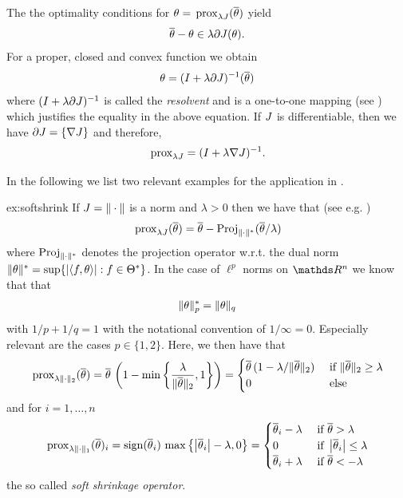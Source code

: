 %
\begin{remark}{}{}
The the optimality conditions for $\theta=\,\mathrm{prox}_{\lambda J}(\overline{\theta})$ yield 
%
\begin{align*}
\pparam - \param \in \lambda \partial \func(\param).%
\end{align*}
%
For a proper, closed and convex function we obtain
%
\begin{align*}
\theta = (I + \lambda\partial J)^{-1}(\overline\theta)
\end{align*}
%
where $(I + \lambda\partial J)^{-1}$ is called the \emph{resolvent} and is a one-to-one mapping (see \cite[Ch. 3.2]{parikh2014proximal})  which justifies the equality in the above equation. If $J$ is differentiable, then we have $\partial J = \{\nabla J\}$ and therefore,
%
\begin{align*}
\,\mathrm{prox}_{\lambda J} = (I + \lambda\nabla J)^{-1}.
\end{align*}
\end{remark}
%
%
\noindent%
In the following we list two relevant examples for the application in \cite{bungert2022bregman, bungert2021neural}.
%
\begin{example}{}{ex:softshrink}
If $J=\|\cdot\|$ is a norm and $\lambda>0$ then we have that (see e.g. \cite{parikh2014proximal})
%
\begin{align*}
\,\mathrm{prox}_{\lambda J}(\overline\theta) = 
\overline\theta - \operatorname{Proj}_{\|\cdot\|^\ast}(\overline\theta/\lambda)
\end{align*}
%
where $\operatorname{Proj}_{\|\cdot\|^\ast}$ denotes the projection operator w.r.t. the dual norm $\|\theta\|^\ast = \sup\{\left|\langle f , \theta\rangle\right|: f\in\Theta^\ast\}$. In the case of $\ell^p$ norms on $\R^n$ we know that that 
%
\begin{align*}
\|\theta\|_p^\ast = \|\theta\|_q
\end{align*}
%
with $1/p + 1/q = 1$ with the notational convention of $1/\infty=0$. Especially relevant are the cases $p\in\{1,2\}$. Here, we then have that
%
\begin{align*}
\prox{\lambda\norm{\cdot}_2}(\pparam) = 
%
\pparam\,\left(1 - \min\left\{\frac{\lambda}{\norm{\pparam}_2}, 1\right\}\right)=
%
\begin{cases}
\pparam\,(1 - \lambda/\norm{\pparam}_2) &\text{ if } \norm{\pparam}_2 \geq \lambda\\
0 &\text{ else}
\end{cases}
\end{align*}
%
and for $i=1,\ldots,n$
%
\begin{align*}
\prox{\lambda\norm{\cdot}_1}(\pparam)_i
%
= \sign(\pparam_i)\, \max\left\{\abs{\pparam_i} - \lambda, 0\right\} =
%
\begin{cases}
\pparam_i -\lambda &\text{ if }\pparam > \lambda\\
0 &\text{ if } \abs{\pparam_i}\leq \lambda\\
\pparam_i +\lambda &\text{ if }\pparam < -\lambda
\end{cases}
\end{align*}
%
the so called \emph{soft shrinkage operator}. 
\end{example}
